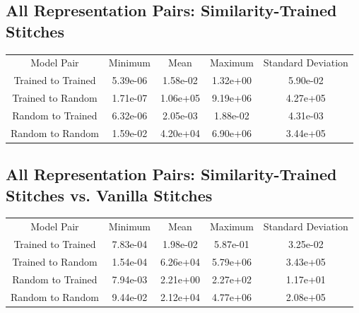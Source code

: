 \documentclass{article} %
\begin{document}
\label{Table5}
\subsection*{All Representation Pairs: Similarity-Trained Stitches}
\begin{tabular}{c c c c c}
   Model Pair&Minimum&Mean&Maximum&Standard Deviation\\
   Trained to Trained&5.39e-06&1.58e-02&1.32e+00&5.90e-02\\
   Trained to Random&1.71e-07&1.06e+05&9.19e+06&4.27e+05\\
   Random to Trained&6.32e-06&2.05e-03&1.88e-02&4.31e-03\\
   Random to Random&1.59e-02&4.20e+04&6.90e+06&3.44e+05\\
\end{tabular}

\label{Table6}
\subsection*{All Representation Pairs: Similarity-Trained Stitches vs. Vanilla Stitches}
\begin{tabular}{c c c c c}
   Model Pair&Minimum&Mean&Maximum&Standard Deviation\\
   Trained to Trained&7.83e-04&1.98e-02&5.87e-01&3.25e-02\\
   Trained to Random&1.54e-04&6.26e+04&5.79e+06&3.43e+05\\
   Random to Trained&7.94e-03&2.21e+00&2.27e+02&1.17e+01\\
   Random to Random&9.44e-02&2.12e+04&4.77e+06&2.08e+05\\
\end{tabular}
\end{document}
